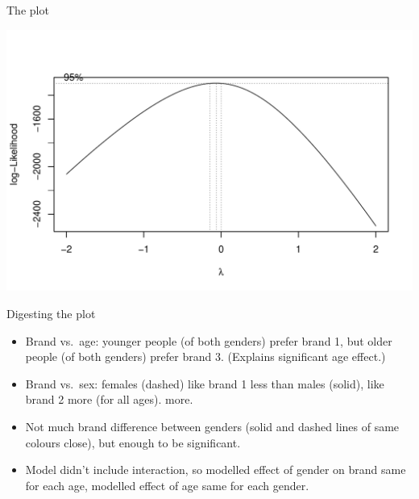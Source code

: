\begin{frame}[fragile]{The plot}
  
\begin{knitrout}
\color{fgcolor}\begin{kframe}
\begin{alltt}
\hlstd{(}
  \hlopt{+}
  \hlstd{()}\hlopt{+}\hlstd{(}\hlstd{(}
\end{alltt}
\end{kframe}
\includegraphics[width=\maxwidth]{figure/unnamed-chunk-38-1} 

\end{knitrout}
\end{frame}


\begin{frame}[fragile]{Digesting the plot}
  
  \begin{itemize}
  \item Brand vs.\ age: younger people (of both genders) prefer brand
    1, but older people (of both genders) prefer brand 3. (Explains
    significant age effect.)
  \item Brand vs.\ sex: females (dashed) like brand 1 less than males
    (solid), like brand 2 more (for all ages). 
    more.
  \item Not much brand difference between genders (solid and dashed
    lines of same colours close), but enough to be significant.
  \item Model didn't include interaction, so modelled effect of gender
    on brand same for each age, modelled effect of age same for each
    gender. 
  \end{itemize}
  
\end{frame}


